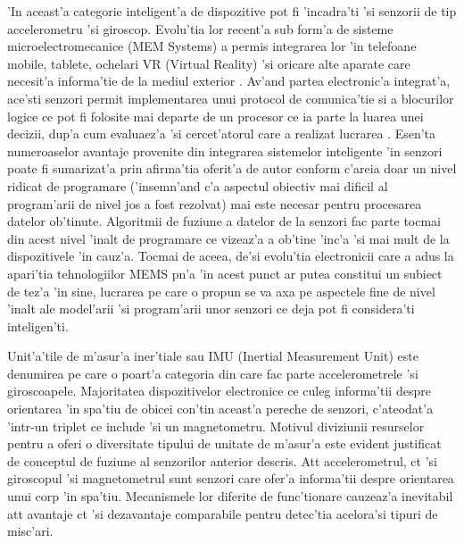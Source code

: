 \documentclass[12pt,a4paper,twoside]{report}
\begin{document}
'In aceast'a categorie inteligent'a de dispozitive pot fi 'incadra'ti 'si senzorii de tip accelerometru 'si giroscop. Evolu'tia lor recent'a sub form'a de sisteme microelectromecanice (MEM Systems) a permis integrarea lor 'in telefoane mobile, tablete, ochelari VR (Virtual Reality) 'si oricare alte aparate care necesit'a informa'tie de la mediul exterior \cite{7979175}. Av'and partea electronic'a integrat'a, ace'sti senzori permit implementarea unui protocol de comunica'tie si a blocurilor logice ce pot fi folosite mai departe de un procesor ce ia parte la luarea unei decizii, dup'a cum evaluaez'a 'si cercet'atorul care a realizat lucrarea \cite{5739775}. Esen'ta numeroaselor avantaje provenite din integrarea sistemelor inteligente 'in senzori poate fi sumarizat'a prin afirma'tia oferit'a de autor conform c'areia doar un nivel ridicat de programare ('insemn'and c'a aspectul obiectiv mai dificil al program'arii de nivel jos a fost rezolvat) mai este necesar pentru procesarea datelor ob'tinute.  Algoritmii de fuziune a datelor de la senzori fac parte tocmai din acest nivel 'inalt de programare ce vizeaz'a a ob'tine 'inc'a 'si mai mult de la dispozitivele 'in cauz'a. Tocmai de aceea, de'si evolu'tia electronicii care a adus la apari'tia tehnologiilor MEMS p\ia n'a 'in acest punct ar putea constitui un subiect de tez'a 'in sine, lucrarea pe care o propun se va axa pe aspectele fine de nivel 'inalt ale model'arii 'si program'arii unor senzori ce deja pot fi considera'ti inteligen'ti.

\vspace{5px}

Unit'a'tile de m'asur'a iner'tiale sau IMU (Inertial Measurement Unit) este denumirea pe care o poart'a categoria din care fac parte accelerometrele 'si giroscoapele. Majoritatea dispozitivelor electronice ce culeg informa'tii despre orientarea 'in spa'tiu de obicei con'tin aceast'a pereche de senzori, c'ateodat'a 'intr-un triplet ce include 'si un magnetometru. Motivul diviziunii resurselor pentru a oferi o diversitate tipului de unitate de m'asur'a este evident justificat de conceptul de fuziune al senzorilor anterior descris. At\ia t accelerometrul, c\ia t 'si giroscopul 'si magnetometrul sunt senzori care ofer'a informa'tii despre orientarea unui corp 'in spa'tiu. Mecanismele lor diferite de func'tionare cauzeaz'a inevitabil at\ia  t avantaje c\ia t 'si dezavantaje comparabile pentru detec'tia acelora'si tipuri de misc'ari.

\vspace{5px}
\end{document}
